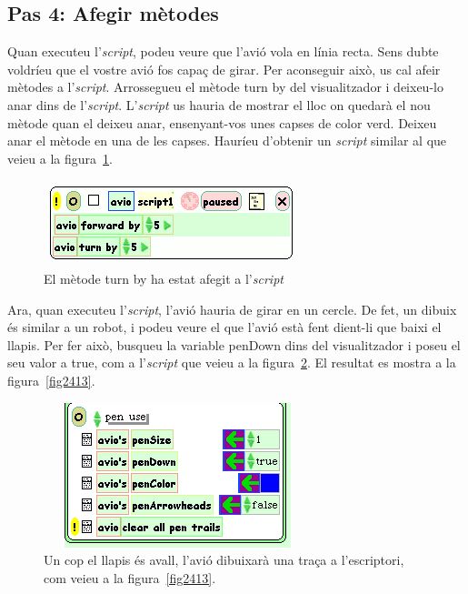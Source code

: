 \subsection{Pas 4: Afegir mètodes}
Quan executeu l'\emph{script}, podeu veure que l'avió vola en línia recta. Sens dubte voldríeu que el vostre avió fos capaç de girar. Per aconseguir això, us cal afeir mètodes a l'\emph{script}. Arrossegueu el mètode \textsf{turn by} del visualitzador i deixeu-lo anar dins de l'\emph{script}. L'\emph{script} us hauria de mostrar el lloc on quedarà el nou mètode quan el deixeu anar, ensenyant-vos unes capses de color verd. Deixeu anar el mètode en una de les capses. Hauríeu d'obtenir un \emph{script} similar al que veieu a la figura~\ref{fig2411}. 
\begin{figure}[h!]
\begin{center}
\includegraphics[scale=1]{Imatges/figura24-11}
\end{center}
\caption{El mètode \textsf{\upshape turn by} ha estat afegit a l'\emph{script}}
\label{fig2411}
\end{figure}

Ara, quan executeu l'\emph{script}, l'avió hauria de girar en un cercle. De fet, un dibuix és similar a un robot, i podeu veure el que l'avió està fent dient-li que baixi el llapis. Per fer això, busqueu la variable \textsf{penDown} dins del visualitzador i poseu el seu valor a \textsf{true}, com a l'\emph{script} que veieu a la figura~\ref{fig2412}. El resultat es mostra a la figura~\ref{fig2413}. 
\begin{figure}[h!]
\begin{center}
\includegraphics[scale=0.6]{Imatges/figura24-12}
\end{center}
\caption{Un cop el llapis és avall, l'avió dibuixarà una traça a l'escriptori, com veieu a la figura~\ref{fig2413}.}
\label{fig2412}
\end{figure}

